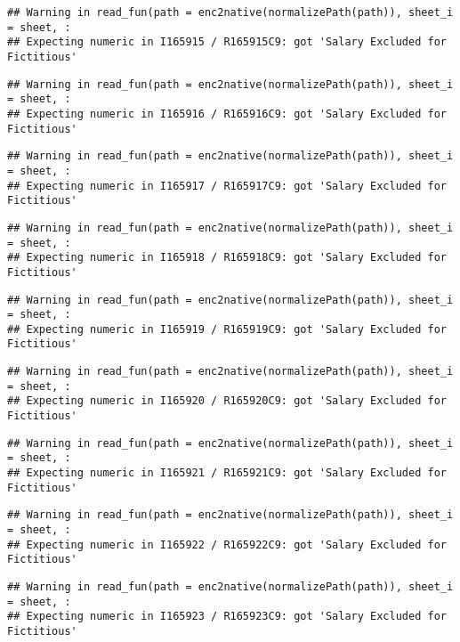 \documentclass[
]{article}
\begin{document}
\begin{verbatim}
## Warning in read_fun(path = enc2native(normalizePath(path)), sheet_i = sheet, :
## Expecting numeric in I165915 / R165915C9: got 'Salary Excluded for Fictitious'
\end{verbatim}

\begin{verbatim}
## Warning in read_fun(path = enc2native(normalizePath(path)), sheet_i = sheet, :
## Expecting numeric in I165916 / R165916C9: got 'Salary Excluded for Fictitious'
\end{verbatim}

\begin{verbatim}
## Warning in read_fun(path = enc2native(normalizePath(path)), sheet_i = sheet, :
## Expecting numeric in I165917 / R165917C9: got 'Salary Excluded for Fictitious'
\end{verbatim}

\begin{verbatim}
## Warning in read_fun(path = enc2native(normalizePath(path)), sheet_i = sheet, :
## Expecting numeric in I165918 / R165918C9: got 'Salary Excluded for Fictitious'
\end{verbatim}

\begin{verbatim}
## Warning in read_fun(path = enc2native(normalizePath(path)), sheet_i = sheet, :
## Expecting numeric in I165919 / R165919C9: got 'Salary Excluded for Fictitious'
\end{verbatim}

\begin{verbatim}
## Warning in read_fun(path = enc2native(normalizePath(path)), sheet_i = sheet, :
## Expecting numeric in I165920 / R165920C9: got 'Salary Excluded for Fictitious'
\end{verbatim}

\begin{verbatim}
## Warning in read_fun(path = enc2native(normalizePath(path)), sheet_i = sheet, :
## Expecting numeric in I165921 / R165921C9: got 'Salary Excluded for Fictitious'
\end{verbatim}

\begin{verbatim}
## Warning in read_fun(path = enc2native(normalizePath(path)), sheet_i = sheet, :
## Expecting numeric in I165922 / R165922C9: got 'Salary Excluded for Fictitious'
\end{verbatim}

\begin{verbatim}
## Warning in read_fun(path = enc2native(normalizePath(path)), sheet_i = sheet, :
## Expecting numeric in I165923 / R165923C9: got 'Salary Excluded for Fictitious'
\end{verbatim}
\end{document}
